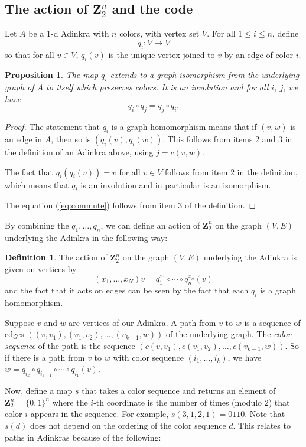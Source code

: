 \documentclass[12pt,twoside,singlespace]{article}
\numberwithin{equation}{section}
\newtheorem{prop}[equation]{Proposition}
\theoremstyle{definition}
\newtheorem{definition}[equation]{Definition}
\newcommand{\ZZ}{\mathbf{Z}}
\begin{document}
\subsection{The action of $\ZZ_2^n$ and the code}
Let $A$ be a $1$-d Adinkra with $n$ colors, with vertex set $V$.  For all $1\le i\le n$, define
\[q_i:V\to V\]
so that for all $v\in V$, $q_i(v)$ is the unique vertex joined to $v$ by an edge of color $i$.

\begin{prop}
\label{prop:qmap}
The map $q_i$ extends to a graph isomorphism from the underlying graph of $A$ to itself which preserves colors.  It is an involution and for all $i$, $j$, we have
\begin{equation}
q_i\circ q_j=q_j\circ q_i.\label{eq:commute}
\end{equation}
\end{prop}
\begin{proof}
The statement that $q_i$ is a graph homomorphism means that if $(v,w)$ is an edge in $A$, then so is $(q_i(v),q_i(w))$.  This follows from items 2 and 3 in the definition of an Adinkra above, using $j=c(v,w)$.

The fact that $q_i(q_i(v))=v$ for all $v\in V$ follows from item 2 in the definition, which means that $q_i$ is an involution and in particular is an isomorphism.

The equation (\ref{eq:commute}) follows from item 3 of the definition.
\end{proof}

By combining the $q_1,\ldots, q_n$, we can define an action of $\ZZ_2^n$ on the graph $(V,E)$ underlying the Adinkra in the following way:
\begin{definition}
The action of $\ZZ_2^n$ on the graph $(V,E)$ underlying the Adinkra is given on vertices by
\[(x_1,\ldots,x_N)v=q_1^{x_1}\circ\cdots\circ q_n^{x_n}(v)\]
and the fact that it acts on edges can be seen by the fact that each $q_i$ is a graph homomorphism.
\end{definition}

Suppose $v$ and $w$ are vertices of our Adinkra.  A path from $v$ to $w$ is a sequence of edges $((v,v_1),(v_1,v_2),\ldots,(v_{k-1},w))$ of the underlying graph.  The {\em color sequence} of the path is the sequence $(c(v,v_1),c(v_1,v_2),\ldots,c(v_{k-1},w))$.  So if there is a path from $v$ to $w$ with color sequence $(i_1, \ldots, i_k)$, we have $w=q_{i_k}\circ q_{i_{k-1}}\circ \cdots\circ q_{i_1}(v)$.


Now, define a map $s$ that takes a color sequence and returns an element of $\ZZ_2^n=\{0,1\}^n$ where the $i$-th coordinate is the number of times (modulo $2$) that color $i$ appears in the sequence. For example, $s(3,1,2,1) = 0110$.  Note that $s(d)$ does not depend on the ordering of the color sequence $d$.  This relates to paths in Adinkras because of the following:
\end{document}

